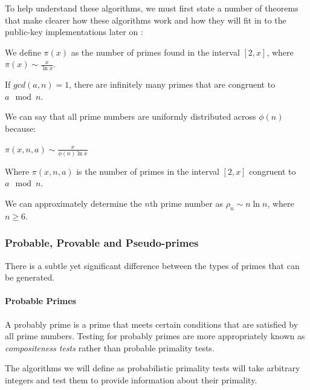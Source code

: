   To help understand these algorithms, we must first state a number of theorems that make clearer how these algorithms work and how they will fit in to the public-key implementations later on \cite{Alfred-Menezes:1996kx}: \\
  
  \begin{mathdef}
    We define $\pi(x)$ as the number of primes found in the interval $[2,x]$, where $\pi(x) \sim \frac{x}{\ln x}$.
  \end{mathdef}
  
  \begin{mathfact}
    If $gcd(a,n) = 1$, there are infinitely many primes that are congruent to $a \mod{n}$.
  \end{mathfact}
  
  \begin{mathfact}
    We can say that all prime numbers are uniformly distributed across $\phi(n)$ because:
    \begin{center}
    	$\pi(x,n,a) \sim \frac{x}{\phi(n) \ln x}$
    \end{center}
    Where $\pi(x,n,a)$ is the number of primes in the interval $[2,x]$ congruent to $a \mod{n}$.
  \end{mathfact}
  
  \begin{mathfact}
    We can approximately determine the $n$th prime number as $\rho_n \sim n \ln n$, where $n \geq 6$.
  \end{mathfact}
  
    \subsubsection{Probable, Provable and Pseudo-primes}
    
    There is a subtle yet significant difference between the types of primes that can be generated.
    
      \paragraph{Probable Primes}
      
      A probably prime is a prime that meets certain conditions that are satisfied by all prime numbers. Testing for probably primes are more appropriately known as \emph{compositeness tests} rather than probable primality tests.
      
      The algorithms we will define as probabilistic primality tests will take arbitrary integers and test them to provide information about their primality. 
      
